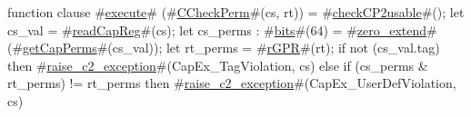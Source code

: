 function clause #\hyperref[zexecute]{execute}# (#\hyperref[zCCheckPerm]{CCheckPerm}#(cs, rt)) =
{
  #\hyperref[zcheckCP2usable]{checkCP2usable}#();
  let cs_val = #\hyperref[zreadCapReg]{readCapReg}#(cs);
  let cs_perms : #\hyperref[zbits]{bits}#(64) = #\hyperref[zzzerozyextend]{zero\_extend}#(#\hyperref[zgetCapPerms]{getCapPerms}#(cs_val));
  let rt_perms = #\hyperref[zrGPR]{rGPR}#(rt);
  if not (cs_val.tag) then
    #\hyperref[zraisezyc2zyexception]{raise\_c2\_exception}#(CapEx_TagViolation, cs)
  else if (cs_perms & rt_perms) != rt_perms then
    #\hyperref[zraisezyc2zyexception]{raise\_c2\_exception}#(CapEx_UserDefViolation, cs)
}
